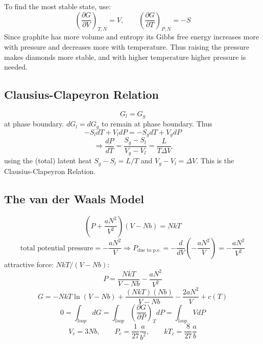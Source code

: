 \documentclass[a4paper,norsk, 10pt]{article}
\newcommand{\pd}[3]{\left(\frac{\partial #1}{\partial #2}\right)_{#3}}
\begin{document}
To find the most stable state, use:
\begin{equation}
\pd{G}{V}{T,N} = V, \qquad \pd{G}{T}{P,N} = -S
\end{equation}
Since graphite has more volume and entropy its Gibbs free energy increases more with pressure and decreases more with temperature. Thus raising the pressure makes diamonds more stable, and with higher temperature higher pressure is needed.
\subsection{Clausius-Clapeyron Relation}
\begin{equation}
G_l = G_g
\end{equation}
at phase boundary. $dG_l = dG_g$ to remain at phase boundary. Thus
\begin{equation}
-S_ldT + V_ldP = -S_gdT + V_gdP
\end{equation}
\begin{equation}
\Rightarrow \frac{dP}{dT} = \frac{S_g - S_l}{V_g - V_l} = \frac{L}{T\Delta V}
\end{equation}
using the (total) latent heat $S_g - S_l = L/T$ and $V_g - V_l = \Delta V$. This is the Clausius-Clapeyron Relation.

\subsection{The van der Waals Model}
\begin{equation}
\left( P + \frac{aN^2}{V^2}\right)(V-Nb) = NkT
\end{equation}
\begin{equation}
\text{total potential pressure} = -\frac{aN^2}{V} \Rightarrow P_{\text{due to p.e.}} = -\frac{d}{dV}\left(-\frac{aN^2}{V}\right) = -\frac{aN^2}{V^2}
\end{equation}
attractive force: $NkT/(V-Nb)$:
\begin{equation}
P = \frac{NkT}{V - Nb} -\frac{aN^2}{V^2}
\end{equation}
\begin{equation}
G = -NkT\ln(V-Nb) + \frac{(NkT)(Nb)}{V-Nb}- \frac{2aN^2}{V} + c(T)
\end{equation}
\begin{equation}
0 = \int_{loop} dG = \int_{loop}\pd{G}{P}{T} dP = \int_{loop} V dP 
\end{equation}
\begin{equation}
V_c = 3Nb,\qquad P_c = \frac{1}{27}\frac{a}{b^2}, \qquad kT_c = \frac{8}{27}\frac{a}{b}
\end{equation}
\end{document}
